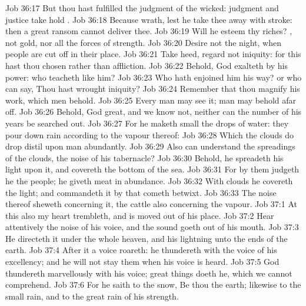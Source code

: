 \vs Job 36:17 But thou hast fulfilled the judgment of the wicked: judgment and justice take hold .
\vs Job 36:18 Because  wrath,  lest he take thee away with  stroke: then a great ransom cannot deliver thee.
\vs Job 36:19 Will he esteem thy riches? , not gold, nor all the forces of strength.
\vs Job 36:20 Desire not the night, when people are cut off in their place.
\vs Job 36:21 Take heed, regard not iniquity: for this hast thou chosen rather than affliction.
\vs Job 36:22 Behold, God exalteth by his power: who teacheth like him?
\vs Job 36:23 Who hath enjoined him his way? or who can say, Thou hast wrought iniquity?
\vs Job 36:24 Remember that thou magnify his work, which men behold.
\vs Job 36:25 Every man may see it; man may behold  afar off.
\vs Job 36:26 Behold, God  great, and we know  not, neither can the number of his years be searched out.
\vs Job 36:27 For he maketh small the drops of water: they pour down rain according to the vapour thereof:
\vs Job 36:28 Which the clouds do drop  distil upon man abundantly.
\vs Job 36:29 Also can  understand the spreadings of the clouds,  the noise of his tabernacle?
\vs Job 36:30 Behold, he spreadeth his light upon it, and covereth the bottom of the sea.
\vs Job 36:31 For by them judgeth he the people; he giveth meat in abundance.
\vs Job 36:32 With clouds he covereth the light; and commandeth it  by  that cometh betwixt.
\vs Job 36:33 The noise thereof sheweth concerning it, the cattle also concerning the vapour.
\vs Job 37:1 At this also my heart trembleth, and is moved out of his place.
\vs Job 37:2 Hear attentively the noise of his voice, and the sound  goeth out of his mouth.
\vs Job 37:3 He directeth it under the whole heaven, and his lightning unto the ends of the earth.
\vs Job 37:4 After it a voice roareth: he thundereth with the voice of his excellency; and he will not stay them when his voice is heard.
\vs Job 37:5 God thundereth marvellously with his voice; great things doeth he, which we cannot comprehend.
\vs Job 37:6 For he saith to the snow, Be thou  the earth; likewise to the small rain, and to the great rain of his strength.
